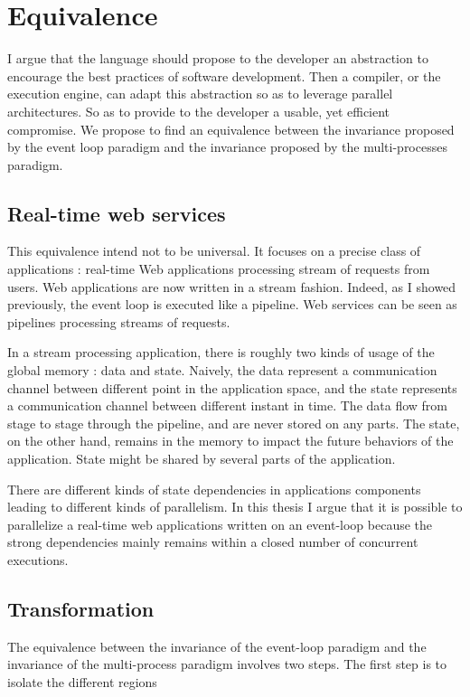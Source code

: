 \section{Equivalence}

I argue that the language should propose to the developer an abstraction to encourage the best practices of software development.
Then a compiler, or the execution engine, can adapt this abstraction so as to leverage parallel architectures. 
So as to provide to the developer a usable, yet efficient compromise.
We propose to find an equivalence between the invariance proposed by the event loop paradigm and the invariance proposed by the multi-processes paradigm.

\subsection{Real-time web services}

This equivalence intend not to be universal.
It focuses on a precise class of applications : real-time Web applications processing stream of requests from users.
Web applications are now written in a stream fashion.
Indeed, as I showed previously, the event loop is executed like a pipeline.
Web services can be seen as pipelines processing streams of requests.

In a stream processing application, there is roughly two kinds of usage of the global memory : data and state.
Naively, the data represent a communication channel between different point in the application space, and the state represents a communication channel between different instant in time.
The data flow from stage to stage through the pipeline, and are never stored on any parts.
The state, on the other hand, remains in the memory to impact the future behaviors of the application.
State might be shared by several parts of the application.

There are different kinds of state dependencies in applications components leading to different kinds of parallelism.
In this thesis I argue that it is possible to parallelize a real-time web applications written on an event-loop because the strong dependencies mainly remains within a closed number of concurrent executions.

\subsection{Transformation}

The equivalence between the invariance of the event-loop paradigm and the invariance of the multi-process paradigm involves two steps.
The first step is to isolate the different regions 


